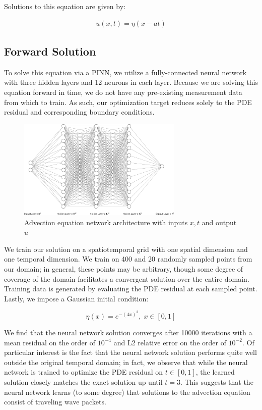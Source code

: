 \documentclass[letterpaper,11pt]{article}
\begin{document}
    Solutions to this equation are given by:

    \begin{align*}
        u(x, t) = \eta(x - at)
    \end{align*}


    \subsection*{Forward Solution}{\label{sec:advection-equation-forwared}}
    To solve this equation via a PINN, we utilize a fully-connected neural network with three hidden layers and 12 
    neurons in each layer. Because we are solving this equation forward in time, we do not have any pre-existing 
    measurement data from which to train. As such, our optimization target reduces solely to the PDE residual and 
    corresponding boundary conditions.


    \begin{figure}[h]
        \centering
        \includegraphics[width=0.70\textwidth]{nn.png}
        \caption{Advection equation network architecture with inputs $x, t$ and output $u$}
    \end{figure}

    We train our solution on a spatiotemporal grid with one spatial dimension and one temporal dimension. We train on 
    400 and 20 randomly sampled points from our domain; in general, these points may be arbitrary, though some degree of
    coverage of the domain facilitates a convergent solution over the entire domain. Training data is generated by 
    evaluating the PDE residual at each sampled point. Lastly, we impose a Gaussian initial condition:

    $$
    \eta(x) = e^{-(4x)^2},\; x \in [0, 1]
    $$
    
    We find that the neural network solution converges after 10000 iterations with a mean residual on the order of 
    $10^{-4}$ and L2 relative error on the order of $10^{-2}$. Of particular interest is the fact that the neural 
    network solution performs quite well outside the original temporal domain; in fact, we observe that while the neural
    network is trained to optimize the PDE residual on $t \in [0, 1]$, the learned solution closely matches the exact 
    solution up until $t=3$. This suggests that the neural network learns (to some degree) that solutions to the 
    advection equation consist of traveling wave packets.
\end{document}
